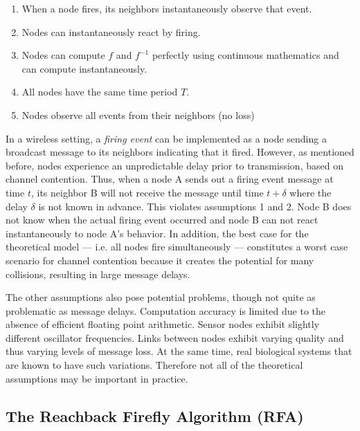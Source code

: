 \documentclass{sig-alternate}
\begin{document}
\begin{enumerate}

\item When a node fires, its neighbors instantaneously observe that
event. 

\item Nodes can instantaneously react by firing.

\item Nodes can compute $f$ and $f^{-1}$ perfectly using continuous
mathematics and can compute instantaneously.

\item All nodes have the same time period $T$.

\item Nodes observe all events from their neighbors (no loss)

\end{enumerate}

In a wireless setting, a {\em firing event} can be implemented as a
node sending a broadcast message to its neighbors indicating that it
fired. However, as mentioned before, nodes experience an unpredictable
delay prior to transmission, based on channel contention. Thus, when a
node A sends out a firing event message at time $t$, its neighbor
B will not receive the message until time $t + \delta$ where the
delay $\delta$ is not known in advance.  This violates assumptions 1
and 2. Node B does not know when the actual firing event occurred
and node B can not react instantaneously to node A's behavior. In
addition, the best case for the theoretical model --- i.e. all nodes
fire simultaneously --- constitutes a worst case scenario for channel
contention because it creates the potential for many collisions,
resulting in large message delays.

The other assumptions also pose potential problems, though not quite
as problematic as message delays. Computation accuracy is limited due
to the absence of efficient floating point arithmetic.  Sensor nodes
exhibit slightly different oscillator frequencies. Links between nodes
exhibit varying quality and thus varying levels of message loss. At
the same time, real biological systems that are known to have such
variations. Therefore not all of the theoretical assumptions may be
important in practice.

\subsection{The Reachback Firefly Algorithm (RFA)}
\end{document}
